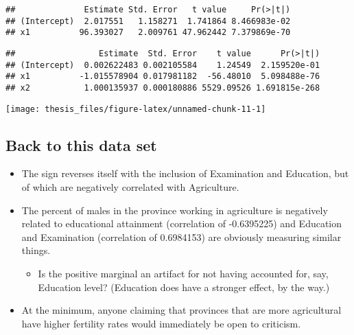 \documentclass[12pt,openright,oneside,a4paper,chapter=TITLE,section=TITLE,subsection=Title,english,french,spanish,portugues,sumario=tradicional]{04-class-files/abntex2}
\newenvironment{Shaded}{\begin{snugshade}}{\end{snugshade}}
\newcommand{\KeywordTok}[1]{\textcolor[rgb]{0.13,0.29,0.53}{\textbf{#1}}}
\newcommand{\NormalTok}[1]{#1}
\newcommand{\OperatorTok}[1]{\textcolor[rgb]{0.81,0.36,0.00}{\textbf{#1}}}
\newcommand{\StringTok}[1]{\textcolor[rgb]{0.31,0.60,0.02}{#1}}
\providecommand{\tightlist}{%
  \setlength{\itemsep}{0pt}\setlength{\parskip}{0pt}}
\begin{document}
\begin{verbatim}
##              Estimate Std. Error   t value     Pr(>|t|)
## (Intercept)  2.017551   1.158271  1.741864 8.466983e-02
## x1          96.393027   2.009761 47.962442 7.379869e-70
\end{verbatim}

\begin{Shaded}
\end{Shaded}

\begin{verbatim}
##                 Estimate  Std. Error    t value      Pr(>|t|)
## (Intercept)  0.002622483 0.002105584    1.24549  2.159520e-01
## x1          -1.015578904 0.017981182  -56.48010  5.098488e-76
## x2           1.000135937 0.000180886 5529.09526 1.691815e-268
\end{verbatim}

\begin{center}\texttt{[image: thesis\_files/figure-latex/unnamed-chunk-11-1]} \end{center}

\hypertarget{back-to-this-data-set}{%
\subsection{Back to this data set}\label{back-to-this-data-set}}

\begin{itemize}
\tightlist
\item
  The sign reverses itself with the inclusion of Examination and Education, but of which are negatively correlated with Agriculture.
\item
  The percent of males in the province working in agriculture is negatively related to educational attainment (correlation of -0.6395225) and Education and Examination (correlation of 0.6984153) are obviously measuring similar things.

  \begin{itemize}
  \tightlist
  \item
    Is the positive marginal an artifact for not having accounted for, say, Education level? (Education does have a stronger effect, by the way.)
  \end{itemize}
\item
  At the minimum, anyone claiming that provinces that are more agricultural have higher fertility rates would immediately be open to criticism.
\end{itemize}
\end{document}
